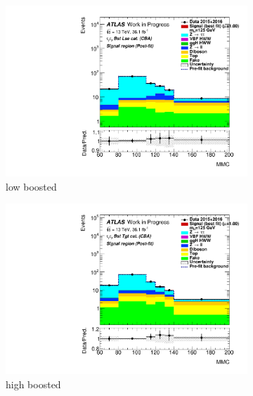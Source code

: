 \begin{figure}[htb]
    \centering
    \begin{subfigure}[t]{0.45\textwidth}
        \includegraphics[width=\textwidth]{./plots/fit/cba/sig_boostloose.pdf}
        \caption{low boosted}
    \end{subfigure}
    \begin{subfigure}[t]{0.45\textwidth}
        \includegraphics[width=\textwidth]{./plots/fit/cba/sig_boosttight.pdf}
        \caption{high boosted}
    \end{subfigure}
    \begin{subfigure}[t]{0.45\textwidth}

\end{subfigure}
\end{figure}
